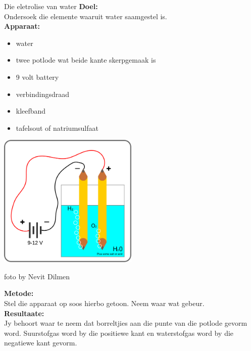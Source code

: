 \begin{g_experiment}{Die eletrolise van water}
\textbf{Doel:} \\
Ondersoek die elemente waaruit water saamgestel is.\\
\textbf{Apparaat:}\\
\begin{minipage}{.4\textwidth}
\begin{itemize}[noitemsep]
 \item water
\item twee potlode wat beide kante skerpgemaak is
\item 9 volt battery
\item verbindingsdraad
\item kleefband
\item tafelsout of natriumsulfaat
\end{itemize}
\end{minipage}
\begin{minipage}{.6\textwidth} 
\begin{center}
   \includegraphics[width=0.5\textwidth]{photos/electrolysis.png}\\
\begin{caption}foto by Nevit Dilmen\end{caption}
\end{center}
\end{minipage} \nopagebreak
\textbf{Metode:}\\
Stel die apparaat op soos hierbo getoon. Neem waar wat gebeur.\\
\textbf{Resultaate:}\\
Jy behoort waar te neem dat borreltjies aan die punte van die potlode gevorm word. Suurstofgas word by die positiewe kant en waterstofgas word by die negatiewe kant gevorm.
\end{g_experiment}

            \nopagebreak

